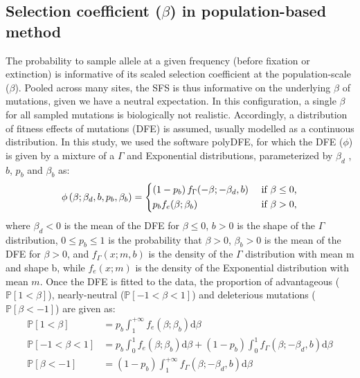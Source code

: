 \documentclass{article}
\newcommand{\der}{\mathrm{d}}
\newcommand{\proba}{\mathbb{P}}
\newcommand{\Spop}{\beta}
\newcommand{\polyDel}{\proba \left[ {\Spop < -1} \right]}
\newcommand{\polyNeutral}{\proba \left[ -1 < \Spop < 1 \right]}
\newcommand{\polyAdv}{\proba \left[ 1 < \Spop  \right]}
\begin{document}
    \subsection{Selection coefficient ($\Spop$) in population-based method}
    \label{subsec:s-polymorphism-method}
    The probability to sample allele at a given frequency (before fixation or extinction) is informative of its scaled selection coefficient at the population-scale ($\Spop$).
    Pooled across many sites, the SFS is thus informative on the underlying $\Spop$ of mutations, given we have a neutral expectation.
    In this configuration, a single $\Spop$ for all sampled mutations is biologically not realistic.
    Accordingly, a distribution of fitness effects of mutations (DFE) is assumed, usually modelled as a continuous distribution\cite{eyre-walker_distribution_2006, eyre-walker_estimating_2009}.
    In this study, we used the software polyDFE\cite{tataru_inference_2017, tataru_polydfe_2020}, for which the DFE ($\phi$) is given by a mixture of a $\Gamma$ and Exponential distributions, parameterized by $\Spop_d$ , $b$, $p_b$
    and $\Spop_b$ as:
    \begin{equation*}
        \phi \left( \Spop; \Spop_d , b, p_b, \Spop_b \right) =
        \begin{dcases}
            \left( 1 - p_b \right) f_{\Gamma}(-\Spop; -\Spop_d, b) & \text{ if $\Spop \leq 0$,} \\
            p_b f_{e}(\Spop; \Spop_b) & \text{ if $\Spop > 0$,} \\
        \end{dcases}
    \end{equation*}
    where $\Spop_d < 0 $ is the mean of the DFE for $\Spop \leq 0$,
    $b > 0$ is the shape of the $\Gamma$ distribution,
    $0 \leq p_b \leq 1$ is the probability that $\Spop > 0$,
    $\Spop_b > 0$ is the mean of the DFE for $\Spop > 0$,
    and $f_{\Gamma}(x; m, b)$ is the density of the $\Gamma$ distribution with mean m and shape b, while $f_{e}(x; m)$ is the density of the Exponential distribution with mean $m$.
    Once the DFE is fitted to the data, the proportion of advantageous ($\polyAdv$), nearly-neutral ($\polyNeutral$) and deleterious mutations ($\polyDel$) are given as:
    \begin{align*}
        \polyAdv &= p_b \int_{1}^{+\infty} f_{e}(\Spop; \Spop_b) \der \Spop  \\
        \polyNeutral &= p_b \int_{0}^{1} f_{e}(\Spop; \Spop_b) \der \Spop + \left( 1 - p_b \right) \int_{0}^{1} f_{\Gamma}(\Spop; -\Spop_d, b) \der \Spop \\
        \polyDel &= \left( 1 - p_b \right) \int_{1}^{+\infty} f_{\Gamma}(\Spop; -\Spop_d, b) \der \Spop
    \end{align*}
\end{document}
